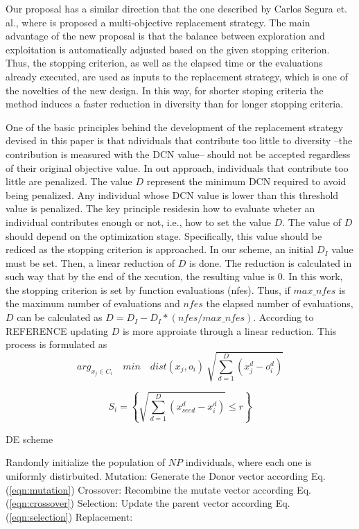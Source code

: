 Our proposal has a similar direction that the one described by Carlos Segura et. al., where is proposed a multi-objective replacement strategy.
%
The main advantage of the new proposal is that the balance between exploration and exploitation is automatically adjusted based on the given stopping criterion.
%
Thus, the stopping criterion, as well as the elapsed time or the evaluations already executed, are used as inputs to the replacement strategy, which is one of the novelties of the new design.
%
In this way, for shorter stoping criteria the method induces a faster reduction in diversity than for longer stopping criteria.


One of the basic principles behind the development of the replacement strategy devised in this paper  is that ndividuals that contribute too little to diversity --the contribution is measured with the DCN value-- should not be accepted regardless of their original objective value.
%
In out approach, individuals that contribute too little are penalized.
%
The value $D$ represent the minimum DCN required to avoid being penalized.
%
Any individual whose DCN value is lower than this threshold value is penalized.
%
The key principle residesin how to evaluate wheter an individual contributes enough or not, i.e., how to set the value $D$.
%
The value of $D$ should depend on the optimization stage.
%
Specifically, this value should be rediced as the stopping criterion is approached.
%
In our scheme, an initial $D_I$ value must be set.
%
Then, a linear reduction of $D$ is done.
%
The reduction is calculated in such way that by the end of the xecution, the resulting value is $0$.
%
In this work, the stopping criterion is set by function evaluations (nfes).
%
Thus, if $max\_nfes$ is the maximum number of evaluations and $nfes$ the elapsed number of evaluations, $D$ can be calculated as $D=D_I - D_I *(nfes/max\_nfes)$.
%
According to REFERENCE updating $D$ is more approiate through a linear reduction.
%
This process is formulated as
\begin{equation}
arg_{x_j \in C_i} \quad min \quad dist(x_j, o_i) \ \sqrt{ \sum_{d=1}^D ( x_j^d - o_i^d )}
\end{equation}

\begin{equation}
S_i = \left \{ \sqrt{ \sum_{d=1}^D (x_{seed}^d - x_i^d )  } \leq r \right \}
\end{equation}


\begin{algorithm}[H]
  \scriptsize
	\caption{DE scheme} 
	\begin{algorithmic}[1]
	\STATE Randomly initialize the population of $NP$ individuals, where each one is uniformly distirbuited.
		\STATE 	Mutation: Generate the Donor vector according Eq. (\ref{eqn:mutation})
		\STATE Crossover: Recombine the mutate vector according Eq. (\ref{eqn:crossover})
		\STATE Selection: Update the parent vector according  Eq. (\ref{eqn:selection})
		\STATE Replacement: 
	   \ENDFOR
	\ENDWHILE
    \label{alg:Fase_Remplazo_VSD-MOEAD}
\end{algorithmic}
\end{algorithm}




